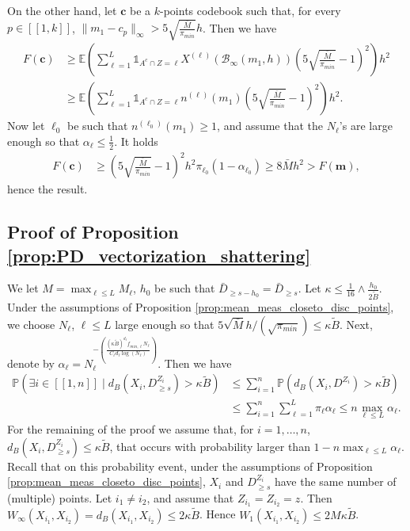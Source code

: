 \documentclass[noinfoline,preprint]{article}
\newcommand{\cb}{\mathbf{c}}
\newcommand{\E}{\mathbb{E}}
\renewcommand{\1}{\mathds 1}
\newcommand{\B}{\mathcal{B}}
\begin{document}
On the other hand, let $\cb$ be a $k$-points codebook such that, for every $p \in [\![1,k]\!]$, $\|m_1-c_p\|_\infty > 5 \sqrt{\frac{\bar{M}}{\pi_{min}}}h$. Then we have
\begin{align*}
F(\cb) & \geq \E \left ( \sum_{\ell = 1}^L \mathds{1}_{A^c \cap Z=\ell} X^{(\ell)}(\B_\infty(m_1,h)) \left ( 5 \sqrt{\frac{\bar{M}}{\pi_{min}}} -1 \right )^2 \right ) h^2 \\
& \geq  \E \left ( \sum_{\ell = 1}^L \mathds{1}_{A^c \cap Z=\ell} n^{(\ell)}(m_1) \left ( 5 \sqrt{\frac{\bar{M}}{\pi_{min}}} -1 \right )^2  \right ) h^2.
\end{align*} 
Now let $\ell_0$ be such that $n^{(\ell_0)}(m_1) \geq 1$, and assume that the $N_\ell$'s are large enough so that $\alpha_\ell \leq \frac{1}{2}$. It holds
\begin{align*}
F(\cb) & \geq  \left ( 5 \sqrt{\frac{\bar{M}}{\pi_{min}}} -1 \right )^2 h^2 \pi_{\ell_0}(1- \alpha_{\ell_0}) 
          \geq 8 \bar{M} h^2 > F(\mathbf{m}),
\end{align*}
hence the result.
\subsection{Proof of Proposition \ref{prop:PD_vectorization_shattering}}\label{sec:proof_prop_PD_vectorization_shattering}
We let $M=\max_{\ell \leq L} M_\ell$, $h_0$ be such that $\bar{D}_{\geq s-h_0} = \bar{D}_{\geq s}$.
Let $\kappa \leq \frac{1}{16} \wedge \frac{h_0}{2\tilde{B}}$. Under the assumptions of Proposition \ref{prop:mean_meas_closeto_disc_points}, we choose $N_\ell$, $\ell \leq L$ large enough so that ${5\sqrt{\bar{M}}h}/(\sqrt{\pi_{min}}) \leq \kappa \tilde{B}$.
Next, denote by $\alpha_\ell = N_\ell^{-\left ( \frac{(\kappa \tilde{B})^{d_\ell} f_{min,\ell} N_\ell}{C_\ell d_\ell \log(N_\ell)}\right)}$. Then we have
\begin{align*}
\mathbb{P} \left ( \exists i \in [\![1,n]\!]\mid  d_B(X_i,D^{Z_i}_{\geq s}) > \kappa \tilde{B} \right ) &\leq \sum_{i=1}^n \mathbb{P} \left ( d_B(X_i,D^{Z_i}) > \kappa \tilde{B} \right ) \\
& \leq \sum_{i=1}^n \sum_{\ell =1}^L \pi_\ell \alpha_\ell  \leq n \max_{\ell \leq L} \alpha_\ell.
\end{align*}
For the remaining of the proof we assume that, for $i=1, \hdots, n$, $d_B(X_i,D^{Z_i}_{\geq s}) \leq \kappa \tilde{B}$, that occurs with probability larger than $1- n \max_{\ell \leq L} \alpha_\ell$. Recall that on this probability event, under the assumptions of Proposition \ref{prop:mean_meas_closeto_disc_points},  $X_i$ and $D^{Z_i}_{\geq s}$ have the same number of (multiple) points.  Let $i_1 \neq i_2$, and assume that $Z_{i_1} = Z_{i_2} = z$. Then $W_\infty(X_{i_1},X_{i_2}) = d_B(X_{i_1},X_{i_2}) \leq 2 \kappa \tilde{B}$. Hence $W_1(X_{i_1},X_{i_2}) \leq 2M\kappa \tilde{B}$.
\end{document}

